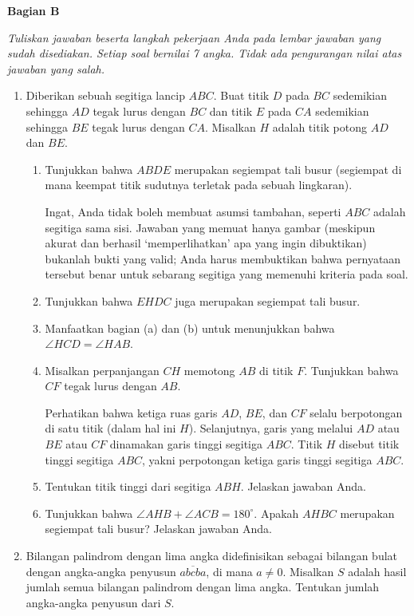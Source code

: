 \documentclass[a4paper,12pt]{article}
\begin{document}
\begin{center}
\textbf{Bagian B}
\end{center}
{\it Tuliskan jawaban beserta langkah pekerjaan Anda pada lembar jawaban yang sudah disediakan. Setiap soal bernilai 7 angka. Tidak ada pengurangan nilai atas jawaban yang salah.}
\begin{enumerate}
\item Diberikan sebuah segitiga lancip $ABC$. Buat titik $D$ pada $BC$ sedemikian sehingga $AD$ tegak lurus dengan $BC$ dan titik $E$ pada $CA$ sedemikian sehingga $BE$ tegak lurus dengan $CA$. Misalkan $H$ adalah titik potong $AD$ dan $BE$.
\begin{enumerate}
	\item Tunjukkan bahwa $ABDE$ merupakan segiempat tali busur (segiempat di mana keempat titik sudutnya terletak pada sebuah lingkaran).

	Ingat, Anda tidak boleh membuat asumsi tambahan, seperti $ABC$ adalah segitiga sama sisi. Jawaban yang memuat hanya gambar (meskipun akurat dan berhasil `memperlihatkan' apa yang ingin dibuktikan) bukanlah bukti yang valid; Anda harus membuktikan bahwa pernyataan tersebut benar untuk sebarang segitiga yang memenuhi kriteria pada soal.

	\item Tunjukkan bahwa $EHDC$ juga merupakan segiempat tali busur.
	\item Manfaatkan bagian (a) dan (b) untuk menunjukkan bahwa $\angle HCD=\angle HAB$.
	\item Misalkan perpanjangan $CH$ memotong $AB$ di titik $F$. Tunjukkan bahwa $CF$ tegak lurus dengan $AB$.

	Perhatikan bahwa ketiga ruas garis $AD$, $BE$, dan $CF$ selalu berpotongan di satu titik (dalam hal ini $H$). Selanjutnya, garis yang melalui $AD$ atau $BE$ atau $CF$ dinamakan garis tinggi segitiga $ABC$. Titik $H$ disebut titik tinggi segitiga $ABC$, yakni perpotongan ketiga garis tinggi segitiga $ABC$.

	\item Tentukan titik tinggi dari segitiga $ABH$. Jelaskan jawaban Anda.
	\item Tunjukkan bahwa $\angle AHB+\angle ACB=180^{\circ}$. Apakah $AHBC$ merupakan segiempat tali busur? Jelaskan jawaban Anda.

\end{enumerate}

\item Bilangan palindrom dengan lima angka didefinisikan sebagai bilangan bulat dengan angka-angka penyusun $\overline{abcba}$, di mana $a \neq 0$. Misalkan $S$ adalah hasil jumlah semua bilangan palindrom dengan lima angka. Tentukan jumlah angka-angka penyusun dari $S$.


\end{enumerate}
\end{document}

